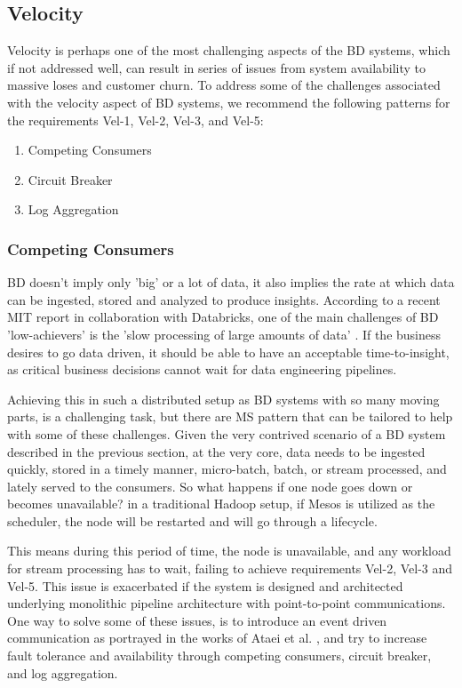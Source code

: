 \documentclass{bmcart}
\begin{document}
\subsection{Velocity}

Velocity is perhaps one of the most challenging aspects of the BD systems, which if not addressed well, can result in series of issues from system availability to massive loses and customer churn. To address some of the challenges associated with the velocity aspect of BD systems, we recommend the following patterns for the requirements Vel-1, Vel-2, Vel-3, and Vel-5:


\begin{enumerate}
  \item Competing Consumers
  \item Circuit Breaker
  \item Log Aggregation
\end{enumerate}


\subsubsection{Competing Consumers}

BD doesn't imply only 'big' or a lot of data, it also implies the rate at which data can be ingested, stored and analyzed to produce insights. According to a recent MIT report in collaboration with Databricks, one of the main challenges of BD 'low-achievers' is the 'slow processing of large amounts of data' \cite{DataBricksSurvey}. If the business desires to go data driven, it should be able to have an acceptable time-to-insight, as critical business decisions cannot wait for data engineering pipelines. 

Achieving this in such a distributed setup as BD systems with so many moving parts, is a challenging task, but there are MS pattern that can be tailored to help with some of these challenges. Given the very contrived scenario of a BD system described in the previous section, at the very core, data needs to be ingested quickly, stored in a timely manner, micro-batch, batch, or stream processed, and lately served to the consumers. So what happens if one node goes down or becomes unavailable? in a traditional Hadoop setup, if Mesos is utilized as the scheduler, the node will be restarted and will go through a lifecycle. 

This means during this period of time, the node is unavailable, and any workload for stream processing has to wait, failing to achieve requirements Vel-2, Vel-3 and Vel-5. This issue is exacerbated if the system is designed and architected underlying monolithic pipeline architecture with point-to-point communications. One way to solve some of these issues, is to introduce an event driven communication as portrayed in the works of Ataei et al. \cite{ataei2021neomycelia}, and try to increase fault tolerance and availability through competing consumers, circuit breaker, and log aggregation. 
\end{document}
